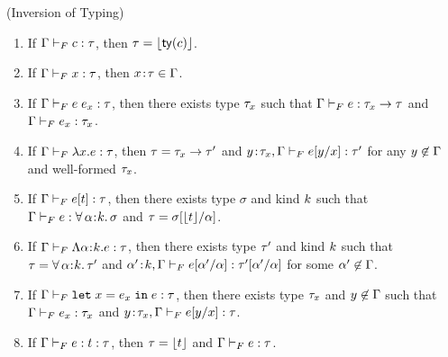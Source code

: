\begin{fullversion}
\begin{lemma}\label{lem:inversionF} (Inversion of Typing) 
    \begin{enumerate}%
        \item If $\hasftype{\tcenv}{c}{\sftype}$, 
            then $\sftype = \forgetreft{\ty{c}}$.
        \item If $\hasftype{\tcenv}{x}{\sftype}$, 
            then $\bind{x}{\sftype} \in \tcenv$.
        \item If $\hasftype{\tcenv}{\app{e}{e_x}}{\sftype}$,
            then there exists type $\sftype_x$ such that  
            $\hasftype{\tcenv}{e}{\funcftype{\sftype_x}{\sftype}}$ and
            $\hasftype{\tcenv}{e_x}{\sftype_x}$.
        \item If $\hasftype{\tcenv}{\vabs{x}{e}}{\sftype}$,\! 
            then $\sftype = \funcftype{\sftype_x}{\sftype'}$ and
            $\hasftype{\bind{y}{\sftype_x},\tcenv}{\subst{e}{x}{y}}{\sftype'}$
            for any $\notmem{y}{\tcenv}$ and well-formed $\sftype_x$.
        \item If $\hasftype{\tcenv}{\tyapp{e}{t}}{\sftype}$,\! then there exists 
            type $\sigma$ and kind $\skind$ such that 
            $\hasftype{\tcenv}{e}{\polytype{\al}{\skind}{\sigma}}$
            and $\sftype = \subst{\sigma}{\al}{\forgetreft{t}}$.
        \item If $\hasftype{\tcenv}{\tabs{\al}{\skind}{e}}{\sftype}$, then
            there exists type $\sftype'$ and kind $\skind$ such that
            $\sftype = {\polytype{\al}{\skind}{\sftype'}}$ and
            $\hasftype{\bind{\al'}{\skind},\tcenv}{\subst{e}{\al}{\al'}}
            {\subst{\sftype'}{\al}{\al'}}$ for some $\notmem{\al'}{\tcenv}$.
        \item If $\hasftype{\tcenv}{\eletin{x}{e_x}{e}}{\sftype}$, then
            there exists type $\sftype_x$ and $\notmem{y}{\tcenv}$ such that
            $\hasftype{\tcenv}{e_x}{\sftype_x}$ and 
            $\hasftype{\bind{y}{\sftype_x},\tcenv}{\subst{e}{x}{y}}{\sftype}$.
        \item If $\hasftype{\tcenv}{\tyann{e}{t}}{\sftype}$, then 
            $\sftype = \forgetreft{t}$ and $\hasftype{\tcenv}{e}{\sftype}$.
        

\end{enumerate}
\end{lemma}
\end{fullversion}
